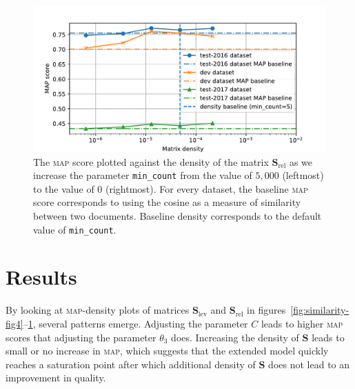 \documentclass[
  digital, %
  notable, %
  lof,     %
  lot,     %
  nopalatino, color
]{fithesis3}
\def\abbr#1{\textsc{\MakeLowercase{#1}}}
\begin{document}
\begin{figure}[tb]
\centering%
\includegraphics[trim={0.6cm 0.1cm 1.5cm 1.0cm}, scale=0.75]{figs/fig1}
\caption[A \abbr{MAP}-density plot for matrix $\mathbf S_{\textrm{rel}}$
and parameter \texttt{min\_count}]{The
  \abbr{MAP}\index{map@\protect\abbr{MAP}} score plotted against the density of
  the matrix $\mathbf S_{\textrm{rel}}$
  as we increase the parameter
  \texttt{min\_count} from the value of
  $5{,}000$ (leftmost) to the value of $0$ (rightmost). For every
  dataset, the baseline \abbr{MAP} score corresponds to using the cosine as a
  measure of similarity between two documents. Baseline density corresponds to
  the default value of \texttt{min\_count}.}
  \label{fig:similarity-fig1}
\end{figure}

\section{Results}
\label{sec:similarity-results}
By looking at \abbr{MAP}\index{map@\abbr {MAP}}-density plots of matrices
$\mathbf S_{\textrm{lev}}$ and $\mathbf S_{\textrm{rel}}$
in figures~\ref{fig:similarity-fig4}--\ref{fig:similarity-fig1},
several patterns emerge. Adjusting the parameter $C$ leads to
higher \abbr{MAP} scores that adjusting the parameter
$\theta_3$ does. Increasing the density of $\mathbf
S$ leads to small or no increase in \abbr{MAP}, which
suggests that the extended model quickly reaches
a saturation point after which additional density of $\mathbf S$ does not lead
to an improvement in quality.
\end{document}
